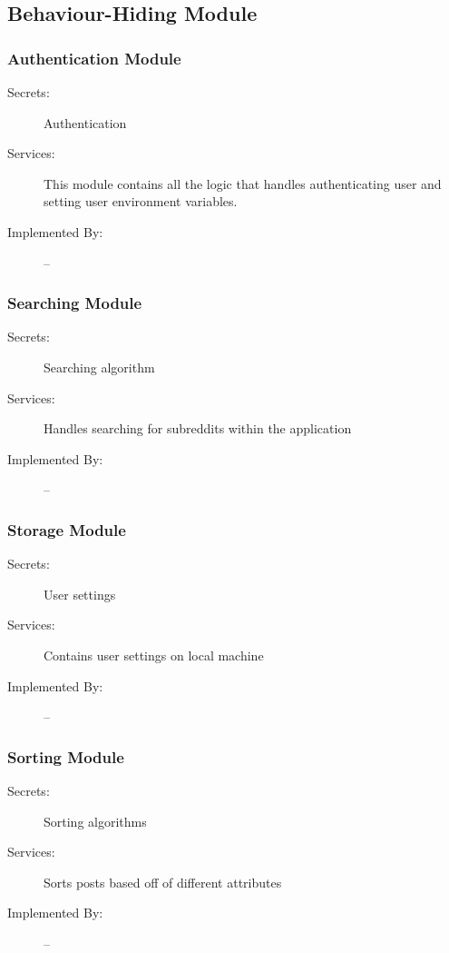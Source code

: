 \documentclass[12pt,fleqn]{article}
\begin{document}
\subsection{Behaviour-Hiding Module}

\subsubsection{Authentication Module}
\begin{description}
\item[Secrets:] Authentication
\item[Services:] This module contains all the logic that handles authenticating user and setting user environment variables. 
\item[Implemented By:] --
\end{description}

\subsubsection{Searching Module}
\begin{description}
\item[Secrets:] Searching algorithm
\item[Services:] Handles searching for subreddits within the application 
\item[Implemented By:] --
\end{description}

\subsubsection{Storage Module}
\begin{description}
\item[Secrets:] User settings
\item[Services:] Contains user settings on local machine
\item[Implemented By:] --
\end{description}

\subsubsection{Sorting Module}
\begin{description}
\item[Secrets:] Sorting algorithms
\item[Services:] Sorts posts based off of different attributes
\item[Implemented By:] --
\end{description}
\end{document}

